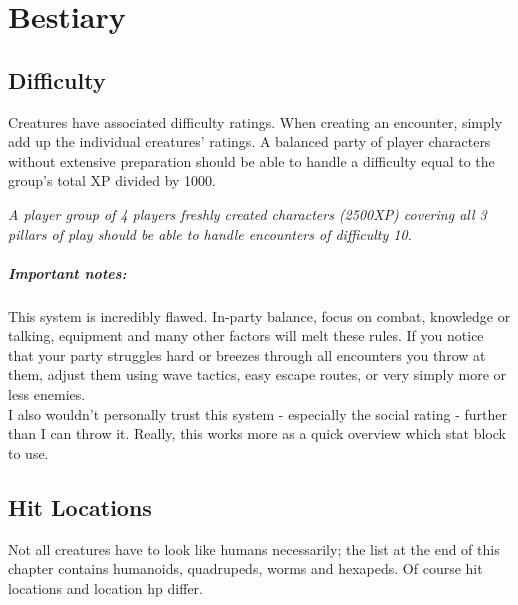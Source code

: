 \documentclass[12pt,a4paper,openany]{book}
\begin{document}
	\chapter{Bestiary}
	\section{Difficulty}
	Creatures have associated difficulty ratings. When creating an encounter, simply add up the individual creatures' ratings. A balanced party of player characters without extensive preparation should be able to handle a difficulty equal to the group's total XP divided by 1000.
	\begin{exampleblock}
		\itshape A player group of 4 players freshly created characters (2500XP) covering all 3 pillars of play should be able to handle encounters of difficulty 10.
	\end{exampleblock}
	\paragraph{Important notes:}
	This system is incredibly flawed. In-party balance, focus on combat, knowledge or talking, equipment and many other factors will melt these rules. If you notice that your party struggles hard or breezes through all encounters you throw at them, adjust them using wave tactics, easy escape routes, or very simply more or less enemies.\\
	I also wouldn't personally trust this system - especially the social rating - further than I can throw it. Really, this works more as a quick overview which stat block to use.
	
	\section{Hit Locations}
	Not all creatures have to look like humans necessarily; the list at the end of this chapter contains humanoids, quadrupeds, worms and hexapeds. Of course hit locations and location hp differ.
	

	\pagebreak
\end{document}
